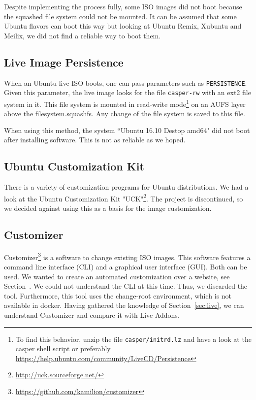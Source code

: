 \documentclass[english]{lni}
\begin{document}
Despite implementing the process fully, some ISO images did not boot because the 
squashed file system could not be mounted.
It can be assumed that some Ubuntu flavors can boot this way but looking at Ubuntu Remix, Xubuntu and Meilix, we did not find a reliable way to boot them.

\subsection{Live Image Persistence}
\label{sec:pers}

When an Ubuntu live ISO boots, one can pass parameters such as \texttt{PERSISTENCE}.
Given this parameter, the live image looks for the file \texttt{casper-rw} with an ext2 file system in it.
This file system is mounted in read-write mode\footnote{To find this behavior, unzip the file \texttt{casper/initrd.lz} and have a look at the casper shell script or preferably \url{https://help.ubuntu.com/community/LiveCD/Persistence}} on an AUFS layer above the filesystem.squashfs.
Any change of the file system is saved to this file.

When using this method, the system ``Ubuntu 16.10 Destop amd64" did not boot after installing software.
This is not as reliable as we hoped.

\subsection{Ubuntu Customization Kit}

There is a variety of customization programs for Ubuntu distributions.
We had a look at the Ubuntu Customization Kit "UCK"\footnote{\url{http://uck.sourceforge.net/}}.
The project is discontinued, so we decided against using this as a basis for the  image customization.


\subsection{Customizer}
\label{sec:customizer}

Customizer\footnote{\url{https://github.com/kamilion/customizer}} is a software to change existing ISO images.
This software features a command line interface (CLI) and a graphical user interface (GUI).
Both can be used.
We wanted to create an automated customization over a website, see Section~\cite{sec:custom}.
We could not understand the CLI at this time.
Thus, we discarded the tool.
Furthermore, this tool uses the change-root environment, which is not available in docker.
Having gathered the knowledge of Section~\ref{sec:live}, we can understand Customizer and compare it with Live Addons.
\end{document}
